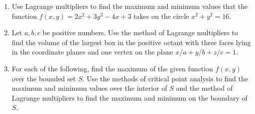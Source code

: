 \documentclass[12pt]{article}
\begin{document}
\begin{enumerate}
\item   \begin{minipage}[t]{3.3in}
   Use Lagrange multipliers to find the maximum and minimum values that 
   the function $f(x,y)= 2x^2+3y^2-4x+3$ takes on the circle $x^2+y^2=16$.
  \end{minipage} \qquad 
  \begin{minipage}[t]{204pt}
  \end{minipage}

\item Let $a,b,c$ be positive numbers.
  Use the method of Lagrange multipliers to find the  volume of the largest box in the positive octant  with three faces lying in the
  coordinate planes and one vertex on the plane $x/a+y/b+z/c=1$.    
\vspace{-2pt}



\item For each of the following, find the maximum of the given function $f(x,y)$ over the bounded set $S$.
  Use the methods of critical point analysis to find the maximum and minimum values over the interior of $S$ and the method
  of Lagrange multipliers to find the maximum and minimum on the boundary of $S$.


\end{enumerate}
\end{document}
